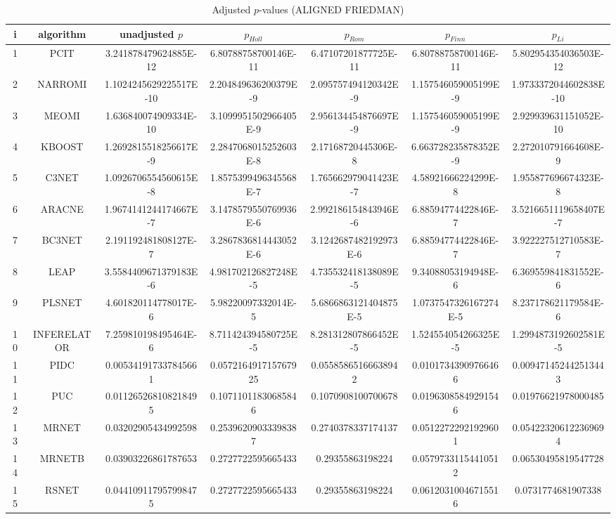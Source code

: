 \documentclass[a4paper,10pt]{article}
\begin{document}
\begin{landscape}
\begin{table}[!htp]
\centering\scriptsize
\caption{Adjusted $p$-values (ALIGNED FRIEDMAN)}
\begin{tabular}{ccccccc}
i&algorithm&unadjusted $p$&$p_{Holl}$&$p_{Rom}$&$p_{Finn}$&$p_{Li}$\\
\hline
1&PCIT&3.241878479624885E-12&6.80788758700146E-11&6.47107201877725E-11&6.80788758700146E-11&5.802954354036503E-12\\
2&NARROMI&1.1024245629225517E-10&2.204849636200379E-9&2.095757494120342E-9&1.157546059005199E-9&1.9733372044602838E-10\\
3&MEOMI&1.636840074909334E-10&3.1099951502966405E-9&2.956134454876697E-9&1.157546059005199E-9&2.929939631151052E-10\\
4&KBOOST&1.2692815518256617E-9&2.2847068015252603E-8&2.17168720445306E-8&6.663728235878352E-9&2.272010791664608E-9\\
5&C3NET&1.0926706554560615E-8&1.8575399496345568E-7&1.765662979041423E-7&4.58921666224299E-8&1.955877696674323E-8\\
6&ARACNE&1.9674141244174667E-7&3.1478579550769936E-6&2.992186154843946E-6&6.88594774422846E-7&3.5216651119658407E-7\\
7&BC3NET&2.191192481808127E-7&3.2867836814443052E-6&3.1242687482192973E-6&6.88594774422846E-7&3.922227512710583E-7\\
8&LEAP&3.5584409671379183E-6&4.981702126827248E-5&4.735532418138089E-5&9.34088053194948E-6&6.369559841831552E-6\\
9&PLSNET&4.601820114778017E-6&5.98220097332014E-5&5.6866863121404875E-5&1.0737547326167274E-5&8.237178621179584E-6\\
10&INFERELATOR&7.259810198495464E-6&8.711424394580725E-5&8.281312807866452E-5&1.524554054266325E-5&1.2994873192602581E-5\\
11&PIDC&0.005341917337845661&0.057216491715767925&0.05585865166638942&0.01017343909766466&0.009471452442513443\\
12&PUC&0.011265268108218495&0.10711011830685846&0.1070908100700678&0.01963085849291546&0.01976621978000485\\
13&MRNET&0.03202905434992598&0.25396209033398387&0.2740378337174137&0.05122722921929601&0.054223206122369694\\
14&MRNETB&0.03903226861787653&0.2727722595665433&0.29355863198224&0.05797331154410512&0.06530495819547728\\
15&RSNET&0.044109117957998475&0.2727722595665433&0.29355863198224&0.06120310046715516&0.0731774681907338\\

\end{tabular}
\end{table}
\end{landscape}
\end{document}
